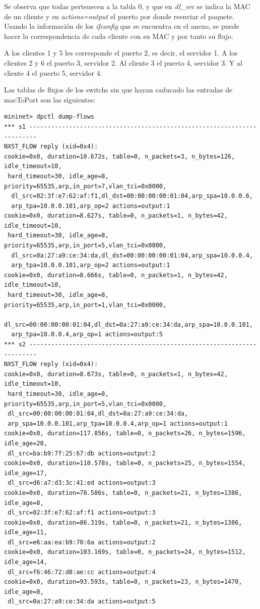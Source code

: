 \documentclass{article}
\begin{document}
Se observa que todas pertenecen a la tabla 0, y que en \textit{dl\_src} se indica la MAC de un cliente y en \textit{actions=output} el puerto por donde reenviar el paquete. Usando la información de los \textit{ifconfig} que se encuentra en el anexo, se puede hacer la correspondencia de cada cliente con su MAC y por tanto su flujo.

A los clientes 1 y 5 les corresponde el puerto 2, es decir, el servidor 1. A los clientes 2 y 6 el puerto 3, servidor 2. Al cliente 3 el puerto 4, servidor 3. Y al cliente 4 el puerto 5, servidor 4.


\hfill

Las tablas de flujos de los switchs sin que hayan caducado las entradas de macToPort son las siguientes:

\begin{Verbatim}
mininet> dpctl dump-flows
*** s1 ------------------------------------------------------------------------
NXST_FLOW reply (xid=0x4):
cookie=0x0, duration=10.672s, table=0, n_packets=3, n_bytes=126, idle_timeout=10,
 hard_timeout=30, idle_age=8, priority=65535,arp,in_port=7,vlan_tci=0x0000,
  dl_src=02:3f:e7:62:af:f1,dl_dst=00:00:00:00:01:04,arp_spa=10.0.0.6,
  arp_tpa=10.0.0.101,arp_op=2 actions=output:1
cookie=0x0, duration=8.627s, table=0, n_packets=1, n_bytes=42, idle_timeout=10,
 hard_timeout=30, idle_age=8, priority=65535,arp,in_port=5,vlan_tci=0x0000,
  dl_src=0a:27:a9:ce:34:da,dl_dst=00:00:00:00:01:04,arp_spa=10.0.0.4,
  arp_tpa=10.0.0.101,arp_op=2 actions=output:1
cookie=0x0, duration=8.666s, table=0, n_packets=1, n_bytes=42, idle_timeout=10,
 hard_timeout=30, idle_age=8, priority=65535,arp,in_port=1,vlan_tci=0x0000,
  dl_src=00:00:00:00:01:04,dl_dst=0a:27:a9:ce:34:da,arp_spa=10.0.0.101,
  arp_tpa=10.0.0.4,arp_op=1 actions=output:5
*** s2 ------------------------------------------------------------------------
NXST_FLOW reply (xid=0x4):
cookie=0x0, duration=8.673s, table=0, n_packets=1, n_bytes=42, idle_timeout=10,
 hard_timeout=30, idle_age=8, priority=65535,arp,in_port=5,vlan_tci=0x0000,
 dl_src=00:00:00:00:01:04,dl_dst=0a:27:a9:ce:34:da,
 arp_spa=10.0.0.101,arp_tpa=10.0.0.4,arp_op=1 actions=output:1
cookie=0x0, duration=117.856s, table=0, n_packets=26, n_bytes=1596, idle_age=20,
 dl_src=ba:b9:7f:25:67:db actions=output:2
cookie=0x0, duration=110.578s, table=0, n_packets=25, n_bytes=1554, idle_age=17,
 dl_src=d6:a7:d3:3c:41:ed actions=output:3
cookie=0x0, duration=78.586s, table=0, n_packets=21, n_bytes=1386, idle_age=8,
 dl_src=02:3f:e7:62:af:f1 actions=output:3
cookie=0x0, duration=86.319s, table=0, n_packets=21, n_bytes=1386, idle_age=11,
 dl_src=e6:aa:ea:b9:70:6a actions=output:2
cookie=0x0, duration=103.169s, table=0, n_packets=24, n_bytes=1512, idle_age=14,
 dl_src=f6:46:72:d8:ae:cc actions=output:4
cookie=0x0, duration=93.593s, table=0, n_packets=23, n_bytes=1470, idle_age=8,
 dl_src=0a:27:a9:ce:34:da actions=output:5
\end{Verbatim}
\end{document}
